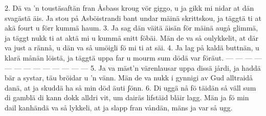 2.  Dä va ’n toustäsaftän fran Åsbass kroug vör giggo,
    u ja gikk mi nidar at dän svagästä äis.
    Ja stou på Asböistrandi bant undar mäinä skrittskou,
    ja täggtä ti at akä fourt u förr kummä haum.
3.  Ja sag dän väitä äisän för mäinä augå glimmä,
    ja täggt nukk ti at aktä mi u kummä snitt föbäi.
    Män de va så oulykkelit, at där va just a rännå,
    u dän va så umöigli fö mi ti at säi.
4.  Ja lag på kaldä buttnän, u klarä månän löistä,
    ja täggtä uppa far u mourm sum dödä var föräut.
    — — — — — — — — — — — — —
5.  Ja va mäst’n värenlausar uppa dissä jårdi,
    ja haddä bär a systar, täu bröidar u ’n vänn.
    Män de va nukk i gynnigi av Gud alltraidå danä,
    at ja skuddä ha så min död äuti ʃönn.
6.  Di uggä nå fö täidän så väll sum di gamblä
    di kann dokk alldri vit, um dairäs lifstäid bläir lagg.
    Män ja fö min dail kanhändä va så lykkeli,
    at ja slapp fran våndän, mäns ja var så ugg.
